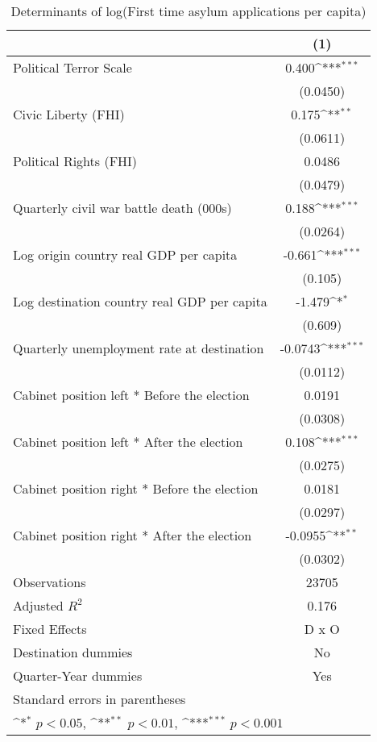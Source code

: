 \begin{table}[htbp]\centering
\def\sym#1{\ifmmode^{#1}\else\(^{#1}\)\fi}
\caption{Determinants of log(First time asylum applications per capita)}
\begin{tabular}{l*{1}{c}}
\hline\hline
                    &\multicolumn{1}{c}{(1)}         \\
\hline
Political Terror Scale&       0.400\sym{***}\\
                    &    (0.0450)         \\
[1em]
Civic Liberty (FHI) &       0.175\sym{**} \\
                    &    (0.0611)         \\
[1em]
Political Rights (FHI)&      0.0486         \\
                    &    (0.0479)         \\
[1em]
Quarterly civil war battle death (000s)&       0.188\sym{***}\\
                    &    (0.0264)         \\
[1em]
Log origin country real GDP per capita&      -0.661\sym{***}\\
                    &     (0.105)         \\
[1em]
Log destination country real GDP per capita&      -1.479\sym{*}  \\
                    &     (0.609)         \\
[1em]
Quarterly unemployment rate at destination&     -0.0743\sym{***}\\
                    &    (0.0112)         \\
[1em]
Cabinet position left * Before the election&      0.0191         \\
                    &    (0.0308)         \\
[1em]
Cabinet position left * After the election&       0.108\sym{***}\\
                    &    (0.0275)         \\
[1em]
Cabinet position right * Before the election&      0.0181         \\
                    &    (0.0297)         \\
[1em]
Cabinet position right * After the election&     -0.0955\sym{**} \\
                    &    (0.0302)         \\
\hline
Observations        &       23705         \\
Adjusted \(R^{2}\)  &       0.176         \\
Fixed Effects       &       D x O         \\
Destination dummies &          No         \\
Quarter-Year dummies&         Yes         \\
\hline\hline
\multicolumn{2}{l}{\footnotesize Standard errors in parentheses}\\
\multicolumn{2}{l}{\footnotesize \sym{*} \(p<0.05\), \sym{**} \(p<0.01\), \sym{***} \(p<0.001\)}\\
\end{tabular}
\end{table}
